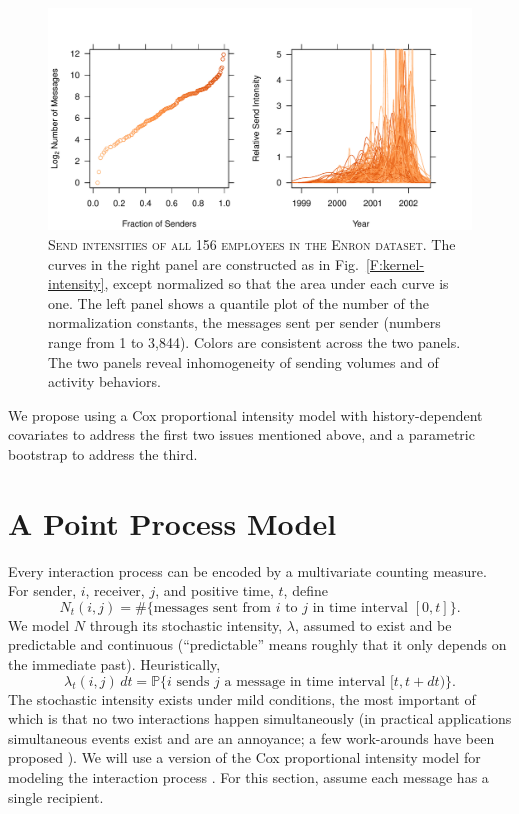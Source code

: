 \documentclass[aoas,preprint]{imsart}
\begin{document}
\begin{figure}
    \includegraphics[scale=0.6]{figures/send-intensities}
    \caption{
        \textsc{Send intensities of all 156 employees in the Enron
        dataset.}  The curves in the right panel are constructed as in
        Fig.~\ref{F:kernel-intensity}, except normalized so that the
        area under each curve is one.   The left panel shows a quantile plot
        of the number of the normalization constants,
        the messages sent per sender (numbers range from 1 to 3,844).
        Colors are consistent across the two panels. 
        The two panels reveal inhomogeneity of sending volumes and of
        activity behaviors.
    }
    \label{F:send-intensities}
\end{figure}

We propose using a Cox proportional intensity model with history-dependent
covariates to address the first two issues mentioned above, and a parametric
bootstrap to address the third.

\section{A Point Process Model}\label{S:point-process-model}

Every interaction process can be encoded by a multivariate counting measure.
For sender, $i$, receiver, $j$, and positive time, $t$, define
\[
    N_t(i,j)
        =
        \#\{\text{messages sent from $i$ to $j$ in time interval $[0,t]$}\}.
\]
We model $N$ through its stochastic intensity, $\lambda$, assumed to
exist and be predictable and continuous (``predictable'' means roughly that
it only depends on the immediate past).  Heuristically,
\[
    \lambda_t(i,j) \, dt
        =
        \mathbb{P}\{
            \text{$i$ sends $j$ a message in time interval $[t,t+dt)$}
        \}.
\]
The stochastic intensity exists under mild conditions, the most important of
which is that no two interactions happen simultaneously (in practical
applications simultaneous events exist and are an annoyance; a few 
work-arounds have been proposed \cite{brostrom2002cox,efron1977efficiency}).
We will use a version of the Cox proportional intensity model for modeling the
interaction process \cite{cox1972regression}.  For this section, assume each
message has a single recipient.
\end{document}
